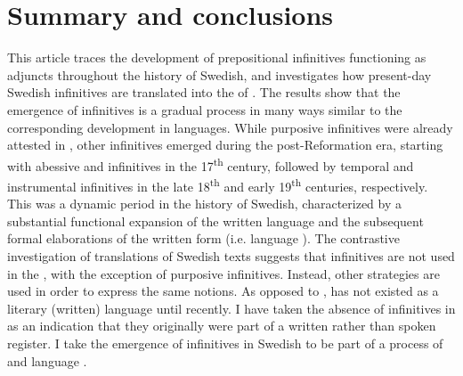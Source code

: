 \documentclass[output=paper]{langscibook}
\begin{document}
\section{Summary and conclusions}\label{sec:kalm:6}


This article traces the development of prepositional infinitives functioning as  adjuncts throughout the history of Swedish, and investigates how present-day Swedish  infinitives are translated into the  of . The results show that the emergence of  infinitives is a gradual process in many ways similar to the corresponding development in  languages. While purposive infinitives were already attested in , other  infinitives emerged during the post-Reformation era, starting with abessive and  infinitives in the 17\textsuperscript{th} century, followed by temporal and instrumental infinitives in the late 18\textsuperscript{th} and early 19\textsuperscript{th} centuries, respectively. This was a dynamic period in the history of Swedish, characterized by a substantial functional expansion of the written language and the subsequent formal elaborations of the written form (i.e. language ). The contrastive investigation of  translations of Swedish texts suggests that  infinitives are not used in the , with the exception of purposive infinitives. Instead, other strategies are used in order to express the same  notions. As opposed to ,  has not existed as a literary (written) language until recently. I have taken the absence of  infinitives in  as an indication that they originally were part of a written rather than spoken register. I take the emergence of  infinitives in Swedish to be part of a process of  and language . 
\end{document}
